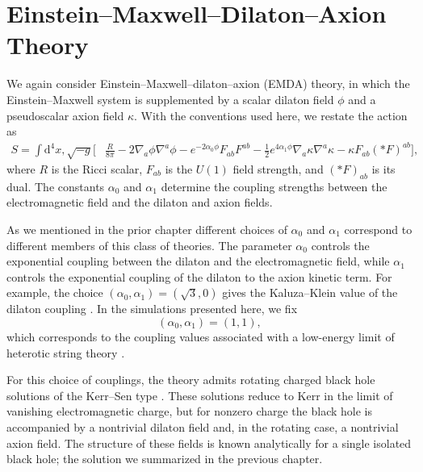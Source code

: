 \section{Einstein--Maxwell--Dilaton--Axion Theory}
\label{sec:emda}

We again consider Einstein--Maxwell--dilaton--axion (EMDA) theory, in which the Einstein--Maxwell system is supplemented by a scalar dilaton field $\phi$ and a pseudoscalar axion field $\kappa$. With the conventions used here, we restate the action as
\begin{equation}
\begin{aligned}
S = \int \mathrm{d}^4 x,\sqrt{-g}\Big[
&\frac{R}{8\pi}
-2\nabla_a\phi\nabla^a\phi
-e^{-2\alpha_0\phi}F_{ab}F^{ab} -\frac{1}{2}e^{4\alpha_1\phi}\nabla_a\kappa\nabla^a\kappa
-\kappa F_{ab}(*F)^{ab}
\Big],
\end{aligned}
\label{eq:emda_action}
\end{equation}
where $R$ is the Ricci scalar, $F_{ab}$ is the $U(1)$ field strength, and $(*F)_{ab}$ is its dual. The constants $\alpha_0$ and $\alpha_1$ determine the coupling strengths between the electromagnetic field and the dilaton and axion fields.

As we mentioned in the prior chapter different choices of $\alpha_0$ and $\alpha_1$ correspond to different members of this class of theories. The parameter $\alpha_0$ controls the exponential coupling between the dilaton and the electromagnetic field, while $\alpha_1$ controls the exponential coupling of the dilaton to the axion kinetic term. For example, the choice $(\alpha_0,\alpha_1)=(\sqrt{3},0)$ gives the Kaluza--Klein value of the dilaton coupling \cite{Horne1992,Mignemi1993_ChargedStringBH}. In the simulations presented here, we fix
\begin{equation}
(\alpha_0,\alpha_1)=(1,1),
\end{equation}
which corresponds to the coupling values associated with a low-energy limit of heterotic string theory \cite{Sen1992,Sen1995}.

For this choice of couplings, the theory admits rotating charged black hole solutions of the Kerr--Sen type \cite{Sen1992}. These solutions reduce to Kerr in the limit of vanishing electromagnetic charge, but for nonzero charge the black hole is accompanied by a nontrivial dilaton field and, in the rotating case, a nontrivial axion field. The structure of these fields is known analytically for a single isolated black hole; the solution we summarized in the previous chapter.

